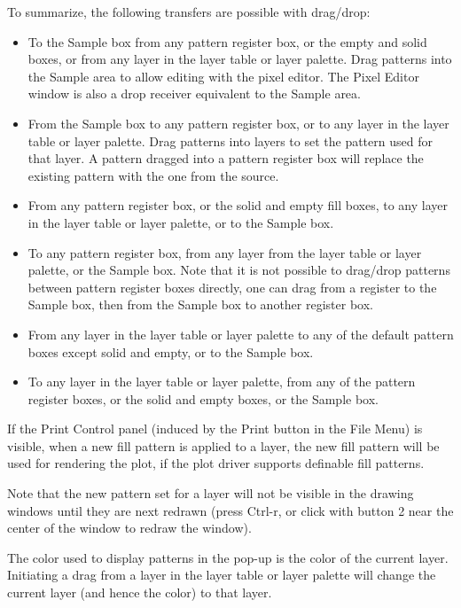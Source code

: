 To summarize, the following transfers are possible with drag/drop:
\begin{itemize}
\item{To the {\cb Sample} box from any pattern register box, or the
empty and solid boxes, or from any layer in the layer table or layer
palette.  Drag patterns into the {\cb Sample} area to allow editing
with the pixel editor.  The {\cb Pixel Editor} window is also a drop
receiver equivalent to the {\cb Sample} area.}

\item{From the {\cb Sample} box to any pattern register box, or to
any layer in the layer table or layer palette.  Drag patterns into
layers to set the pattern used for that layer.  A pattern dragged
into a pattern register box will replace the existing pattern with
the one from the source.}

\item{From any pattern register box, or the solid and empty fill
boxes, to any layer in the layer table or layer palette, or to the
{\cb Sample} box.}

\item{To any pattern register box, from any layer from the layer table
or layer palette, or the {\cb Sample} box.  Note that it is not
possible to drag/drop patterns between pattern register boxes
directly, one can drag from a register to the {\cb Sample} box, then
from the {\cb Sample} box to another register box.}

\item{From any layer in the layer table or layer palette to any of
the default pattern boxes except solid and empty, or to the
{\cb Sample} box.}

\item{To any layer in the layer table or layer palette, from any of
the pattern register boxes, or the solid and empty boxes, or the {\cb
Sample} box.}
\end{itemize}

If the {\cb Print Control} panel (induced by the {\cb Print} button in
the {\cb File Menu}) is visible, when a new fill pattern is applied to
a layer, the new fill pattern will be used for rendering the plot, if
the plot driver supports definable fill patterns.

Note that the new pattern set for a layer will not be visible in the
drawing windows until they are next redrawn (press {\kb Ctrl-r}, or
click with button 2 near the center of the window to redraw the
window).

The color used to display patterns in the pop-up is the color of the
current layer.  Initiating a drag from a layer in the layer table or
layer palette will change the current layer (and hence the color) to
that layer.

